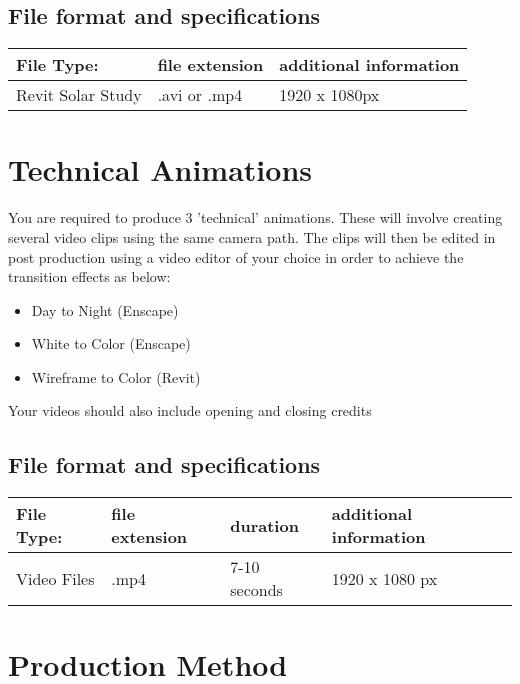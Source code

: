 \subsection*{File format and specifications}

\begin{tabularx}{\textwidth}{ |X|X|X| }
	\hline
	\textbf{File Type:} & file extension & additional information\\
	\hline 
	Revit Solar Study  & .avi or .mp4 & 1920 x 1080px \\
	\hline
\end{tabularx}


\newpage
\section*{Technical Animations}

You are required to produce 3 'technical' animations.  These will involve creating several video clips using the same camera path.  The clips will then be edited in post production using a video editor of your choice in order to achieve the transition effects as below:

\begin{itemize}
	\item Day to Night (Enscape)
	\item White to Color (Enscape)
	\item Wireframe to Color (Revit)
\end{itemize}

Your videos should also include opening and closing credits

\subsection*{File format and specifications}

\begin{tabularx}{\textwidth}{ |X|X|X|X| }
	\hline
	\textbf{File Type:} & file extension & duration & additional information\\
	\hline 
	Video Files  & .mp4 & 7-10 seconds & 1920 x 1080 px  \\
	\hline
\end{tabularx}







\newpage

\section*{Production Method}

